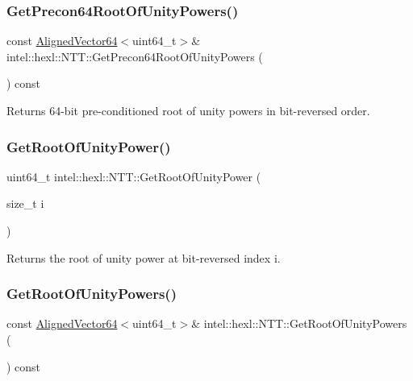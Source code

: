 \subsubsection{\texorpdfstring{Get\+Precon64\+Root\+Of\+Unity\+Powers()}{GetPrecon64RootOfUnityPowers()}}
{\footnotesize\ttfamily const \hyperlink{namespaceintel_1_1hexl_afbdf0d2cc4209ee547a88ff22a02801b}{Aligned\+Vector64}$<$uint64\+\_\+t$>$\& intel\+::hexl\+::\+N\+T\+T\+::\+Get\+Precon64\+Root\+Of\+Unity\+Powers (\begin{DoxyParamCaption}{ }\end{DoxyParamCaption}) const\hspace{0.3cm}{\ttfamily [inline]}}



Returns 64-\/bit pre-\/conditioned root of unity powers in bit-\/reversed order. 

\mbox{\label{classintel_1_1hexl_1_1NTT_af0ab14a87e3f9e8cf46502c4c766fec5}} 
\subsubsection{\texorpdfstring{Get\+Root\+Of\+Unity\+Power()}{GetRootOfUnityPower()}}
{\footnotesize\ttfamily uint64\+\_\+t intel\+::hexl\+::\+N\+T\+T\+::\+Get\+Root\+Of\+Unity\+Power (\begin{DoxyParamCaption}\item[{size\+\_\+t}]{i }\end{DoxyParamCaption})\hspace{0.3cm}{\ttfamily [inline]}}



Returns the root of unity power at bit-\/reversed index i. 

\mbox{\label{classintel_1_1hexl_1_1NTT_a71749beadc3fde1d2b80f2d99b739099}} 
\subsubsection{\texorpdfstring{Get\+Root\+Of\+Unity\+Powers()}{GetRootOfUnityPowers()}}
{\footnotesize\ttfamily const \hyperlink{namespaceintel_1_1hexl_afbdf0d2cc4209ee547a88ff22a02801b}{Aligned\+Vector64}$<$uint64\+\_\+t$>$\& intel\+::hexl\+::\+N\+T\+T\+::\+Get\+Root\+Of\+Unity\+Powers (\begin{DoxyParamCaption}{ }\end{DoxyParamCaption}) const\hspace{0.3cm}{\ttfamily [inline]}}



